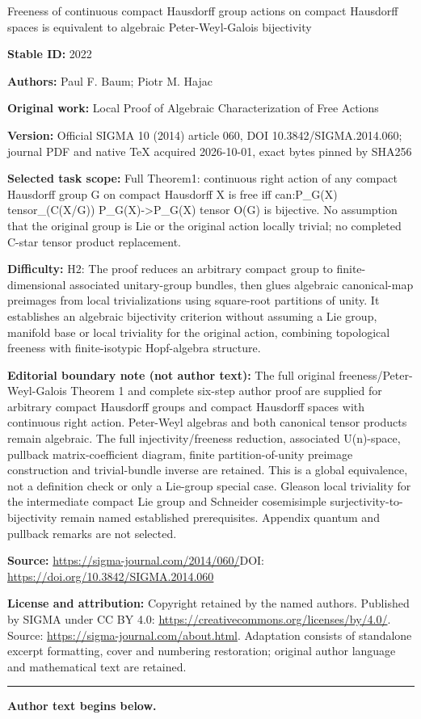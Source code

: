 \documentclass[11pt]{article}
\begin{document}
\begin{center}\Large Freeness of continuous compact Hausdorff group actions on compact Hausdorff spaces is equivalent to algebraic Peter-Weyl-Galois bijectivity\end{center}
\noindent\textbf{Stable ID:} 2022\par
\noindent\textbf{Authors:} Paul F. Baum; Piotr M. Hajac\par
\noindent\textbf{Original work:} Local Proof of Algebraic Characterization of Free Actions\par
\noindent\textbf{Version:} Official SIGMA 10 (2014) article 060, DOI 10.3842/SIGMA.2014.060; journal PDF and native TeX acquired 2026-10-01, exact bytes pinned by SHA256\par
\noindent\textbf{Selected task scope:} Full Theorem1: continuous right action of any compact Hausdorff group G on compact Hausdorff X is free iff can:P\_G(X) tensor\_(C(X/G)) P\_G(X)->P\_G(X) tensor O(G) is bijective. No assumption that the original group is Lie or the original action locally trivial; no completed C-star tensor product replacement.\par
\noindent\textbf{Difficulty:} H2: The proof reduces an arbitrary compact group to finite-dimensional associated unitary-group bundles, then glues algebraic canonical-map preimages from local trivializations using square-root partitions of unity. It establishes an algebraic bijectivity criterion without assuming a Lie group, manifold base or local triviality for the original action, combining topological freeness with finite-isotypic Hopf-algebra structure.\par
\noindent\textbf{Editorial boundary note (not author text):} The full original freeness/Peter-Weyl-Galois Theorem 1 and complete six-step author proof are supplied for arbitrary compact Hausdorff groups and compact Hausdorff spaces with continuous right action. Peter-Weyl algebras and both canonical tensor products remain algebraic. The full injectivity/freeness reduction, associated U(n)-space, pullback matrix-coefficient diagram, finite partition-of-unity preimage construction and trivial-bundle inverse are retained. This is a global equivalence, not a definition check or only a Lie-group special case. Gleason local triviality for the intermediate compact Lie group and Schneider cosemisimple surjectivity-to-bijectivity remain named established prerequisites. Appendix quantum and pullback remarks are not selected.\par
\noindent\textbf{Source:} \url{https://sigma-journal.com/2014/060/}\quad DOI: \url{https://doi.org/10.3842/SIGMA.2014.060}\par
\noindent\textbf{License and attribution:} Copyright retained by the named authors. Published by SIGMA under CC BY 4.0: \url{https://creativecommons.org/licenses/by/4.0/}. Source: \url{https://sigma-journal.com/about.html}. Adaptation consists of standalone excerpt formatting, cover and numbering restoration; original author language and mathematical text are retained.\par
\medskip\hrule\medskip\noindent\textbf{Author text begins below.}\par
\setcounter{section}{0}
\setcounter{subsection}{0}
\setcounter{subsubsection}{0}
\setcounter{equation}{0}
\end{document}
